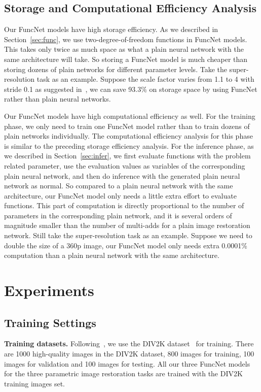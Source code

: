 \documentclass{article}
\begin{document}
\subsection{Storage and Computational Efficiency Analysis}

Our FuncNet models have high storage efficiency. As we described in Section~\ref{sec:func}, we use two-degree-of-freedom functions in FuncNet models. This takes only twice as much space as what a plain neural network with the same architecture will take. So storing a FuncNet model is much cheaper than storing dozens of plain networks for different parameter levels. Take the super-resolution task as an example. Suppose the scale factor varies from 1.1 to 4 with stride 0.1 as suggested in~\cite{hu2019meta}, we can save 93.3\% on storage space by using FuncNet rather than plain neural networks.

Our FuncNet models have high computational efficiency as well. For the training phase, we only need to train one FuncNet model rather than to train dozens of plain networks individually. The computational efficiency analysis for this phase is similar to the preceding storage efficiency analysis. For the inference phase, as we described in Section~\ref{sec:infer}, we first evaluate functions with the problem related parameter, use the evaluation values as variables of the corresponding plain neural network, and then do inference with the generated plain neural network as normal. So compared to a plain neural network with the same architecture, our FuncNet model only needs a little extra effort to evaluate functions. This part of computation is directly proportional to the number of parameters in the corresponding plain network, and it is several orders of magnitude smaller than the number of multi-adds for a plain image restoration network. Still take the super-resolution task as an example. Suppose we need to double the size of a 360p image, our FuncNet model only needs extra 0.0001\% computation than a plain neural network with the same architecture.

\section{Experiments}
\label{sec:4}

\subsection{Training Settings}

\textbf{Training datasets.} Following~\cite{zhang2018image,hu2019meta,yu2019deep}, we use the DIV2K dataset~\cite{timofte2017ntire} for training. There are 1000 high-quality images in the DIV2K dataset, 800 images for training, 100 images for validation and 100 images for testing. All our three FuncNet models for the three parametric image restoration tasks are trained with the DIV2K training images set.
\end{document}
